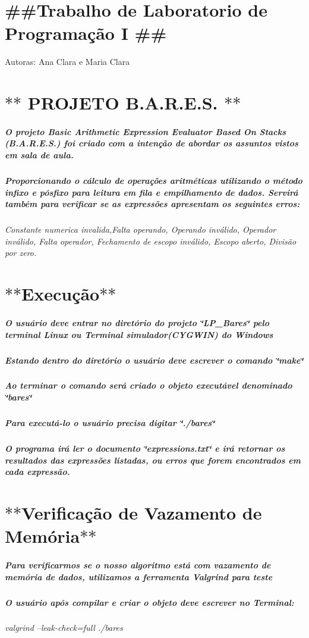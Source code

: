\section*{\#\#\+Trabalho de Laboratorio de Programação I \#\#}

Autoras\+: Ana Clara e Maria Clara

\section*{$\ast$$\ast$ P\+R\+O\+J\+E\+T\+O B.\+A.\+R.\+E.\+S. $\ast$$\ast$}

\subparagraph*{O projeto Basic Arithmetic Expression Evaluator Based On Stacks (B.\+A.\+R.\+E.\+S.) foi criado com a intenção de abordar os assuntos vistos em sala de aula.}

\subparagraph*{Proporcionando o cálculo de operações aritméticas utilizando o método infixo e pósfixo para leitura em fila e empilhamento de dados. Servirá também para verificar se as expressões apresentam os seguintes erros\+:}

{\itshape Constante numerica invalida,Falta operando, Operando inválido, Operador inválido, Falta operador, Fechamento de escopo inválido, Escopo aberto, Divisão por zero.}

\section*{$\ast$$\ast$\+Execução$\ast$$\ast$}

\subparagraph*{O usuário deve entrar no diretório do projeto \char`\"{}\+L\+P\+\_\+\+Bares\char`\"{} pelo terminal Linux ou Terminal simulador(\+C\+Y\+G\+W\+I\+N) do Windows}

\subparagraph*{Estando dentro do diretório o usuário deve escrever o comando \char`\"{}make\char`\"{}}

\subparagraph*{Ao terminar o comando será criado o objeto executável denominado \char`\"{}bares\char`\"{}}

\subparagraph*{Para executá-\/lo o usuário precisa digitar \char`\"{}./bares\char`\"{}}

\subparagraph*{O programa irá ler o documento \char`\"{}expressions.\+txt\char`\"{} e irá retornar os resultados das expressões listadas, ou erros que forem encontrados em cada expressão.}

\section*{$\ast$$\ast$\+Verificação de Vazamento de Memória$\ast$$\ast$ }

\subparagraph*{Para verificarmos se o nosso algoritmo está com vazamento de memória de dados, utilizamos a ferramenta Valgrind para teste}

\subparagraph*{O usuário após compilar e criar o objeto deve escrever no Terminal\+:}

{\itshape valgrind --leak-\/check=full ./bares} 